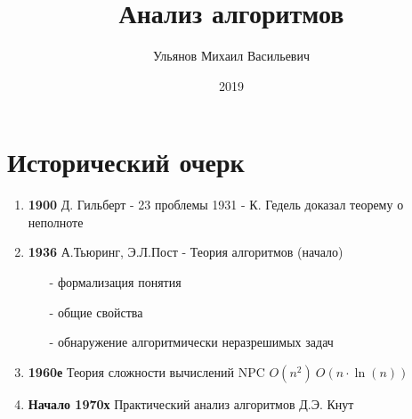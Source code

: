 \documentclass[a4paper, 14pt]{report}
\author{Ульянов Михаил Васильевич}
\title{Анализ алгоритмов}
\date{2019}
\begin{document}
\maketitle

\tableofcontents
\clearpage

\chapter{Исторический очерк}

\begin{enumerate}
    \item \textbf{1900} \newline
        Д. Гильберт - 23 проблемы
        1931 - К. Гедель доказал теорему о неполноте
    \item \textbf{1936} \newline
        А.Тьюринг, Э.Л.Пост - Теория алгоритмов (начало)
    \begin{enumerate}
        \item[-] формализация понятия
        \item[-] общие свойства
        \item[-] обнаружение алгоритмически неразрешимых задач
    \end{enumerate}
    \item \textbf{1960е} \newline
        Теория сложности вычислений NPC \newline
        $O(n^2)\ O(n \cdot \ln(n))$


    \item \textbf{Начало 1970х} \newline
        Практический анализ алгоритмов Д.Э. Кнут
\end{enumerate}
\end{document}
